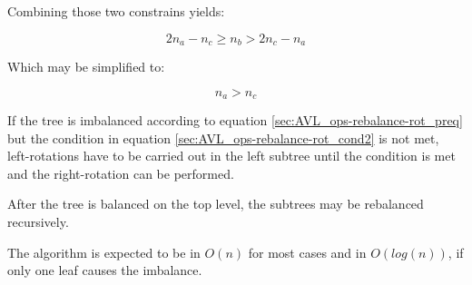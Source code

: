         Combining those two constrains yields:

        \begin{equation}
            2n_a - n_c \geq n_b > 2n_c -n_a
        \end{equation}

        Which may be simplified to:

        \begin{equation}
            n_a > n_c
            \label{sec:AVL_ops-rebalance-rot_cond2}
        \end{equation}

        If the tree is imbalanced according to equation
        \ref{sec:AVL_ops-rebalance-rot_preq} but the condition in equation
        \ref{sec:AVL_ops-rebalance-rot_cond2} is not met, left-rotations have to
        be carried out in the left subtree until the condition is met and the
        right-rotation can be performed.

        After the tree is balanced on the top level, the subtrees may be
        rebalanced recursively.

        The algorithm is expected to be in $O(n)$ for most cases and in
        $O(log(n))$, if only one leaf causes the imbalance.



